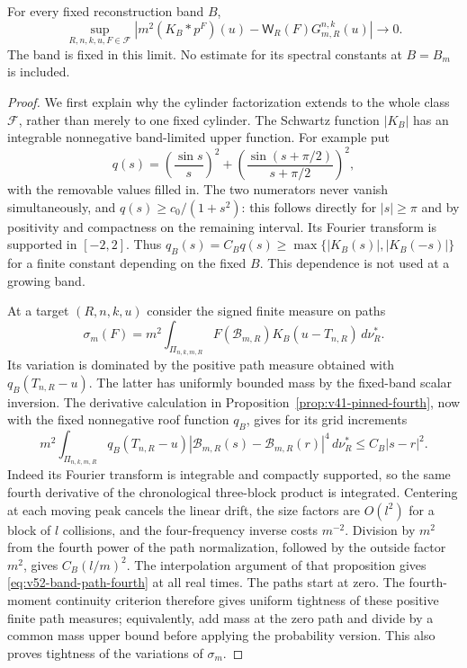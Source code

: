 \begin{lemma}
\label{lem:v52-fixed-band-path}
For every fixed reconstruction band $B$,
\begin{equation}\label{eq:v52-fixed-band-path}
 \sup_{R,n,k,u,F\in\mathcal F}
 \left|m^2(K_B*p^F)(u)
      -\mathsf W_R(F)G_{m,R}^{n,k}(u)\right|\longrightarrow0.
\end{equation}
The band is fixed in this limit. No estimate for its spectral
constants at $B=B_m$ is included.
\end{lemma}
\begin{proof}
We first explain why the cylinder factorization extends to the whole
class $\mathcal F$, rather than merely to one fixed cylinder.
The Schwartz function $|K_B|$ has an integrable nonnegative
band-limited upper function. For example put
\[
 q(s)=\left(\frac{\sin s}{s}\right)^2+
       \left(\frac{\sin(s+\pi/2)}{s+\pi/2}\right)^2,
\]
with the removable values filled in. The two numerators never vanish
simultaneously, and $q(s)\ge c_0/(1+s^2)$: this follows directly for
$|s|\ge\pi$ and by positivity and compactness on the remaining
interval. Its Fourier transform is supported in $[-2,2]$.
Thus $q_B(s)=C_Bq(s)\ge\max\{|K_B(s)|,|K_B(-s)|\}$ for a finite
constant depending on the fixed $B$. This dependence is not used at a growing band.

At a target $(R,n,k,u)$ consider the signed finite measure on paths
\[
 \sigma_m(F)=m^2\int_{\Pi_{n,k,m,R}}
           F(\mathcal B_{m,R})K_B(u-T_{n,R})\,d\nu_R^*.
\]
Its variation is dominated by the positive path measure obtained
with $q_B(T_{n,R}-u)$. The latter has uniformly bounded mass by the
fixed-band scalar inversion. The derivative calculation in
Proposition~\ref{prop:v41-pinned-fourth}, now with the fixed
nonnegative roof function $q_B$, gives for its grid increments
\begin{equation}\label{eq:v52-band-path-fourth}
 m^2\int_{\Pi_{n,k,m,R}}q_B(T_{n,R}-u)
  |\mathcal B_{m,R}(s)-\mathcal B_{m,R}(r)|^4\,d\nu_R^*
                                   \le C_B|s-r|^2.
\end{equation}
Indeed its Fourier transform is integrable and compactly supported,
so the same fourth derivative of the chronological three-block
product is integrated. Centering at each moving peak cancels the
linear drift, the size factors are $O(l^2)$ for a block of $l$
collisions, and the four-frequency inverse costs $m^{-2}$.
Division by $m^2$ from the fourth power of the path normalization,
followed by the outside factor $m^2$, gives $C_B(l/m)^2$.
The interpolation argument of that proposition gives
\eqref{eq:v52-band-path-fourth} at all real times. The paths start
at zero. The fourth-moment continuity criterion therefore gives
uniform tightness of these positive finite path measures; equivalently,
add mass at the zero path and divide by a common mass upper bound
before applying the probability version. This also proves tightness
of the variations of $\sigma_m$.


\end{proof}
